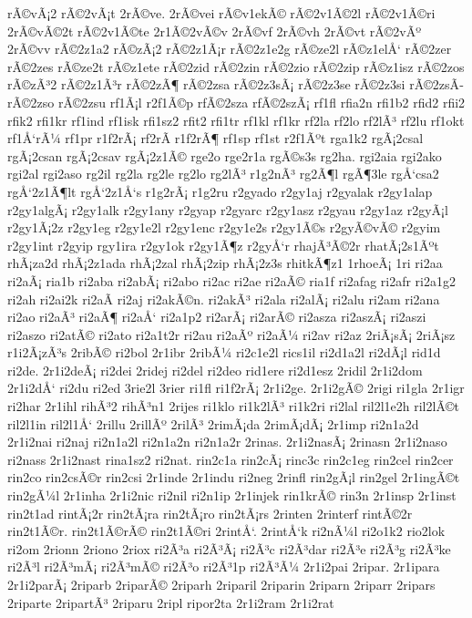 {rÃ©vÃ¡2
rÃ©2vÃ¡t
2rÃ©ve.
2rÃ©vei
rÃ©v1ekÃ©
rÃ©2v1Ã©2l
rÃ©2v1Ã©ri
2rÃ©vÃ©2t
rÃ©2v1Ã©te
2r1Ã©2vÃ©v
2rÃ©vf
2rÃ©vh
2rÃ©vt
rÃ©2vÃº
2rÃ©vv
rÃ©2z1a2
rÃ©zÃ¡2
rÃ©2z1Ã¡r
rÃ©2z1e2g
rÃ©ze2l
rÃ©z1elÅ‘
rÃ©2zer
rÃ©2zes
rÃ©ze2t
rÃ©z1ete
rÃ©2zid
rÃ©2zin
rÃ©2zio
rÃ©2zip
rÃ©z1isz
rÃ©2zos
rÃ©zÃ³2
rÃ©2z1Ã³r
rÃ©2zÃ¶
rÃ©2zsa
rÃ©2z3sÃ¡
rÃ©2z3se
rÃ©2z3si
rÃ©2zsÃ­
rÃ©2zso
rÃ©2zsu
rf1Ã¡l
r2f1Ã©p
rfÃ©2sza
rfÃ©2szÃ¡
rf1fl
rfia2n
rfi1b2
rfid2
rfii2
rfik2
rfi1kr
rf1ind
rf1isk
rfi1sz2
rfit2
rfi1tr
rf1kl
rf1kr
rf2la
rf2lo
rf2lÃ³
rf2lu
rf1okt
rf1Å‘rÃ¼
rf1pr
r1f2rÃ¡
rf2rÃ­
r1f2rÃ¶
rf1sp
rf1st
r2f1Ãºt
rga1k2
rgÃ¡2csal
rgÃ¡2csan
rgÃ¡2csav
rgÃ¡2z1Ã©
rge2o
rge2r1a
rgÃ©s3s
rg2ha.
rgi2aia
rgi2ako
rgi2al
rgi2aso
rg2il
rg2la
rg2le
rg2lo
rg2lÃ³
r1g2nÃ³
rg2Ã¶l
rgÃ¶3le
rgÅ‘csa2
rgÅ‘2z1Ã¶lt
rgÅ‘2z1Å‘s
r1g2rÃ¡
r1g2ru
r2gyado
r2gy1aj
r2gyalak
r2gy1alap
r2gy1algÃ¡
r2gy1alk
r2gy1any
r2gyap
r2gyarc
r2gy1asz
r2gyau
r2gy1az
r2gyÃ¡l
r2gy1Ã¡2z
r2gy1eg
r2gy1e2l
r2gy1enc
r2gy1e2s
r2gy1Ã©s
r2gyÃ©vÃ©
r2gyim
r2gy1int
r2gyip
rgy1ira
r2gy1ok
r2gy1Ã¶z
r2gyÅ‘r
rhajÃ³Ã©2r
rhatÃ¡2s1Ãºt
rhÃ¡za2d
rhÃ¡2z1ada
rhÃ¡2zal
rhÃ¡2zip
rhÃ¡2z3s
rhitkÃ¶z1
1rhoeÃ¡
1ri
ri2aa
ri2aÃ¡
ria1b
ri2aba
ri2abÃ¡
ri2abo
ri2ac
ri2ae
ri2aÃ©
ria1f
ri2afag
ri2afr
ri2a1g2
ri2ah
ri2ai2k
ri2aÃ­
ri2aj
ri2akÃ©n.
ri2akÃ³
ri2ala
ri2alÃ¡
ri2alu
ri2am
ri2ana
ri2ao
ri2aÃ³
ri2aÃ¶
ri2aÅ‘
ri2a1p2
ri2arÃ¡
ri2arÃ©
ri2asza
ri2aszÃ¡
ri2aszi
ri2aszo
ri2atÃ©
ri2ato
ri2a1t2r
ri2au
ri2aÃº
ri2aÃ¼
ri2av
ri2az
2riÃ¡sÃ¡
2riÃ¡sz
r1i2Ã¡zÃ³s
2ribÃ©
ri2bol
2r1ibr
2ribÃ¼
ri2c1e2l
rics1il
ri2d1a2l
ri2dÃ¡l
rid1d
ri2de.
2r1i2deÃ¡
ri2dei
2ridej
ri2del
ri2deo
rid1ere
ri2d1esz
2ridil
2r1i2dom
2r1i2dÅ‘
ri2du
ri2ed
3rie2l
3rier
ri1fl
ri1f2rÃ¡
2r1i2ge.
2r1i2gÃ©
2rigi
ri1gla
2r1igr
ri2har
2r1ihl
rihÃ³2
rihÃ³n1
2rijes
ri1klo
ri1k2lÃ³
ri1k2ri
ri2lal
ril2l1e2h
ril2lÃ©t
ril2l1in
ril2l1Å‘
2rillu
2rillÃº
2rilÃ³
2rimÃ¡da
2rimÃ¡dÃ¡
2r1imp
ri2n1a2d
2r1i2nai
ri2naj
ri2n1a2l
ri2n1a2n
ri2n1a2r
2rinas.
2r1i2nasÃ¡
2rinasn
2r1i2naso
ri2nass
2r1i2nast
rina1sz2
ri2nat.
rin2c1a
rin2cÃ¡
rinc3c
rin2c1eg
rin2cel
rin2cer
rin2co
rin2csÃ©r
rin2csi
2r1inde
2r1indu
ri2neg
2rinfl
rin2gÃ¡l
rin2gel
2r1ingÃ©t
rin2gÃ¼l
2r1inha
2r1i2nic
ri2nil
ri2n1ip
2r1injek
rin1krÃ©
rin3n
2r1insp
2r1inst
rin2t1ad
rintÃ¡2r
rin2tÃ¡ra
rin2tÃ¡ro
rin2tÃ¡rs
2rinten
2rinterf
rintÃ©2r
rin2t1Ã©r.
rin2t1Ã©rÃ©
rin2t1Ã©ri
2rintÅ‘.
2rintÅ‘k
ri2nÃ¼l
ri2o1k2
rio2lok
ri2om
2rionn
2riono
2riox
ri2Ã³a
ri2Ã³Ã¡
ri2Ã³c
ri2Ã³dar
ri2Ã³e
ri2Ã³g
ri2Ã³ke
ri2Ã³l
ri2Ã³mÃ¡
ri2Ã³mÃ©
ri2Ã³o
ri2Ã³1p
ri2Ã³Ã¼
2r1i2pai
2ripar.
2r1ipara
2r1i2parÃ¡
2riparb
2riparÃ©
2riparh
2riparil
2riparin
2riparn
2riparr
2ripars
2riparte
2ripartÃ³
2riparu
2ripl
ripor2ta
2r1i2ram
2r1i2rat
}
